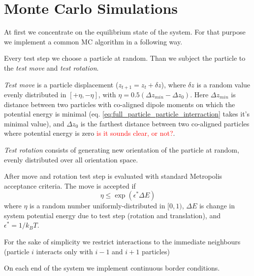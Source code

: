 \section{Monte Carlo Simulations}

At first we concentrate on the equilibrium state of the system. For that purpose we implement a common MC algorithm in a following way.

Every test step we choose a particle at random. Than we subject the particle to the \emph{test move} and \emph{test rotation}.

\emph{Test move} is a particle displacement ($z_{t+1} = z_t + \delta z$), where $\delta z$ is a random value evenly distributed in $[+\eta, -\eta]$, with $\eta = 0.5 (\Delta z_{min} - \Delta z_0)$. Here $\Delta z_{min}$ is distance between two particles with co-aligned dipole moments on which the potential energy is minimal (eq. \eqref{eq:full_particle_particle_interraction} takes it's minimal value), and $\Delta z_0$ is the farthest distance between two co-aligned particles where potential energy is zero \textcolor{red}{is it sounds clear, or not?}.

\emph{Test rotation} consists of generating new orientation of the particle at random, evenly distributed over all orientation space.

After move and rotation test step is evaluated with standard Metropolis acceptance criteria. The move is accepted if
\begin{equation}
\label{eq:metropolis_acceptance}
	\eta \leq \exp(\epsilon^* \Delta E)
\end{equation}
where $\eta$ is a random number uniformly-distributed in $[0, 1)$, $\Delta E$ is change in system potential energy due to test step (rotation and translation), and $\epsilon^* = 1/k_B T$.

For the sake of simplicity we restrict interactions to the immediate neighbours (particle $i$ interacts only with $i-1$ and $i+1$ particles) 

On each end of the system we implement continuous border conditions.